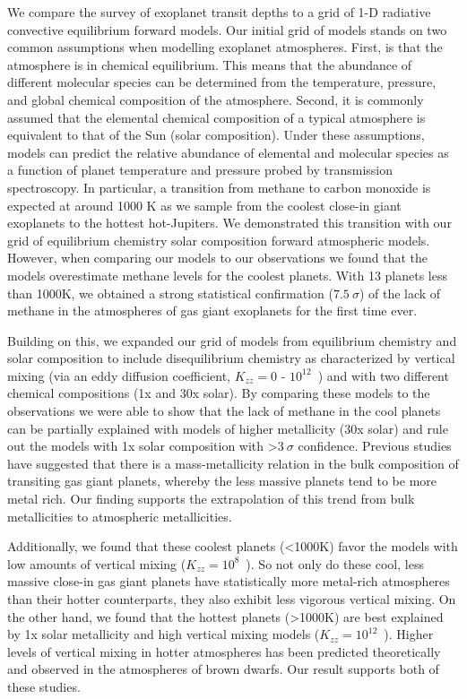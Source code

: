 We compare the survey of exoplanet transit depths to a grid of 1-D radiative convective equilibrium forward models. Our initial grid of models stands on two common assumptions when modelling exoplanet atmospheres. First, is that the atmosphere is in chemical equilibrium. This means that the abundance of different molecular species can be determined from the temperature, pressure, and global chemical composition of the atmosphere. Second, it is commonly assumed that the elemental chemical composition of a typical atmosphere is equivalent to that of the Sun (solar composition). Under these assumptions, models can predict the relative abundance of elemental and molecular species as a function of planet temperature and pressure probed by transmission spectroscopy. In particular, a transition from methane to carbon monoxide is expected at around 1000 K as we sample from the coolest close-in giant exoplanets to the hottest hot-Jupiters. We demonstrated this transition with our grid of equilibrium chemistry solar composition forward atmospheric models. However, when comparing our models to our observations we found that the models overestimate methane levels for the coolest planets. With 13 planets less than 1000K, we obtained a strong statistical confirmation ($7.5~\sigma$) of the lack of methane in the atmospheres of gas giant exoplanets for the first time ever.

Building on this, we expanded our grid of models from equilibrium chemistry and solar composition to include disequilibrium chemistry as characterized by vertical mixing (via an eddy diffusion coefficient, $K_{zz} = 0$ - $10^{12}$~\cmcms) and with two different chemical compositions (1x and 30x solar). By comparing these models to the observations we were able to show that the lack of methane in the cool planets can be partially explained with models of higher metallicity (30x solar) and rule out the models with 1x solar composition with >$3~\sigma$ confidence. Previous studies have suggested that there is a mass-metallicity relation in the bulk composition of transiting gas giant planets, whereby the less massive planets tend to be more metal rich. Our finding supports the extrapolation of this trend from bulk metallicities to atmospheric metallicities.

Additionally, we found that these coolest planets (<1000K) favor the models with low amounts of vertical mixing ($K_{zz} = 10^8$~\cmcms). So not only do these cool, less massive close-in gas giant planets have statistically more metal-rich atmospheres than their hotter counterparts, they also exhibit less vigorous vertical mixing. On the other hand, we found that the hottest planets (>1000K) are best explained by 1x solar metallicity and high vertical mixing models ($K_{zz}= 10^{12}$~\cmcms). Higher levels of vertical mixing in hotter atmospheres has been predicted theoretically and observed in the atmospheres of brown dwarfs. Our result supports both of these studies.

